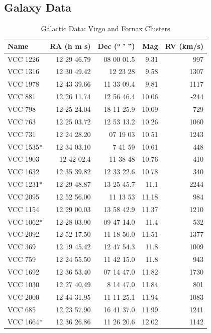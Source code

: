 \documentclass[12pt]{article}
\begin{document}
\subsection{Galaxy Data}

\begin{table}[!htp]
    \centering
    \caption{Galactic Data: Virgo and Fornax Clusters}
    \label{tab:galactic_data}
    \begin{minipage}[t]{.45\linewidth}
        \centering
        \scriptsize
        \begin{tabular}{lrrrr}
            \toprule
                Name & RA (h m s) & Dec (° ' '') & Mag & RV (km/s) \\
                    \midrule
VCC 1226 &12 29 46.79 &08 00 01.5 &9.31 &997 \\
VCC 1316 &12 30 49.42 &12 23 28 &9.58 &1307 \\
VCC 1978 &12 43 39.66 &11 33 09.4 &9.81 &1117 \\
VCC 881 &12 26 11.74 &12 56 46.4 &10.06 &-244 \\
VCC 798 &12 25 24.04 &18 11 25.9 &10.09 &729 \\
VCC 763 &12 25 03.72 &12 53 13.2 &10.26 &1060 \\
VCC 731 &12 24 28.20 &07 19 03 &10.51 &1243 \\
VCC 1535* &12 34 03.10 &7 41 59 &10.61 &448 \\
VCC 1903 &12 42 02.4 &11 38 48 &10.76 &410 \\
VCC 1632 &12 35 39.82 &12 33 22.6 &10.78 &340 \\
VCC 1231* &12 29 48.87 &13 25 45.7 &11.1 &2244 \\
VCC 2095 &12 52 56.00 &11 13 53 &11.18 &984 \\
VCC 1154 &12 29 00.03 &13 58 42.9 &11.37 &1210 \\
VCC 1062* &12 28 03.90 &09 47 14.0 &11.4 &532 \\
VCC 2092 &12 52 17.50 &11 18 50.0 &11.51 &1377 \\
VCC 369 &12 19 45.42 &12 47 54.3 &11.8 &1009 \\
VCC 759 &12 24 55.50 &11 42 15.0 &11.8 &943 \\
VCC 1692 &12 36 53.40 &07 14 47.0 &11.82 &1730 \\
VCC 1030 &12 27 40.49 &8 14 47.0 &11.84 &801 \\
VCC 2000 &12 44 31.95 &11 11 25.1 &11.94 &1083 \\
VCC 685 &12 23 57.90 &16 41 37.0 &11.99 &1241 \\
VCC 1664* &12 36 26.86 &11 26 20.6 &12.02 &1142 \\

\end{tabular}
\end{minipage}
\end{table}
\end{document}
